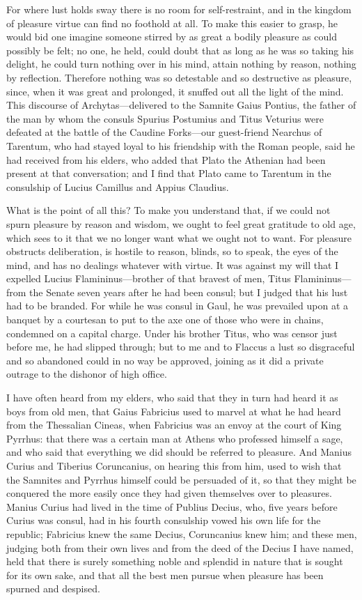  For where lust holds sway there is no room for self-restraint, and in the kingdom of pleasure virtue can find no foothold at all. To make this easier to grasp, he would bid one imagine someone stirred by as great a bodily pleasure as could possibly be felt; no one, he held, could doubt that as long as he was so taking his delight, he could turn nothing over in his mind, attain nothing by reason, nothing by reflection. Therefore nothing was so detestable and so destructive as pleasure, since, when it was great and prolonged, it snuffed out all the light of the mind. This discourse of Archytas—delivered to the Samnite Gaius Pontius, the father of the man by whom the consuls Spurius Postumius and Titus Veturius were defeated at the battle of the Caudine Forks—our guest-friend Nearchus of Tarentum, who had stayed loyal to his friendship with the Roman people, said he had received from his elders, who added that Plato the Athenian had been present at that conversation; and I find that Plato came to Tarentum in the consulship of Lucius Camillus and Appius Claudius.

 What is the point of all this? To make you understand that, if we could not spurn pleasure by reason and wisdom, we ought to feel great gratitude to old age, which sees to it that we no longer want what we ought not to want. For pleasure obstructs deliberation, is hostile to reason, blinds, so to speak, the eyes of the mind, and has no dealings whatever with virtue. It was against my will that I expelled Lucius Flamininus—brother of that bravest of men, Titus Flamininus—from the Senate seven years after he had been consul; but I judged that his lust had to be branded. For while he was consul in Gaul, he was prevailed upon at a banquet by a courtesan to put to the axe one of those who were in chains, condemned on a capital charge. Under his brother Titus, who was censor just before me, he had slipped through; but to me and to Flaccus a lust so disgraceful and so abandoned could in no way be approved, joining as it did a private outrage to the dishonor of high office.

 I have often heard from my elders, who said that they in turn had heard it as boys from old men, that Gaius Fabricius used to marvel at what he had heard from the Thessalian Cineas, when Fabricius was an envoy at the court of King Pyrrhus: that there was a certain man at Athens who professed himself a sage, and who said that everything we did should be referred to pleasure. And Manius Curius and Tiberius Coruncanius, on hearing this from him, used to wish that the Samnites and Pyrrhus himself could be persuaded of it, so that they might be conquered the more easily once they had given themselves over to pleasures. Manius Curius had lived in the time of Publius Decius, who, five years before Curius was consul, had in his fourth consulship vowed his own life for the republic; Fabricius knew the same Decius, Coruncanius knew him; and these men, judging both from their own lives and from the deed of the Decius I have named, held that there is surely something noble and splendid in nature that is sought for its own sake, and that all the best men pursue when pleasure has been spurned and despised.

